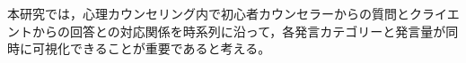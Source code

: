 \documentclass[shuuron]{kuee}
\begin{document}
本研究では，心理カウンセリング内で初心者カウンセラーからの質問とクライエントからの回答との対応関係を時系列に沿って，各発言カテゴリーと発言量が同時に可視化できることが重要であると考える。


%
\end{document}
